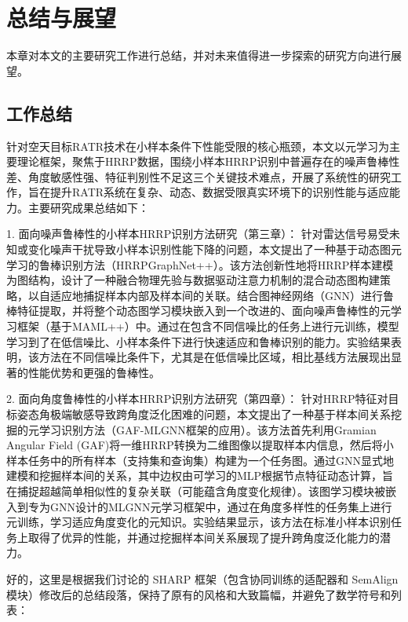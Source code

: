 \chapter{总结与展望}
\label{chap:conclusion}

本章对本文的主要研究工作进行总结，并对未来值得进一步探索的研究方向进行展望。

\section{工作总结}
\label{sec:summary}

针对空天目标RATR技术在小样本条件下性能受限的核心瓶颈，本文以元学习为主要理论框架，聚焦于HRRP数据，围绕小样本HRRP识别中普遍存在的噪声鲁棒性差、角度敏感性强、特征判别性不足这三个关键技术难点，开展了系统性的研究工作，旨在提升RATR系统在复杂、动态、数据受限真实环境下的识别性能与适应能力。主要研究成果总结如下：

1.  面向噪声鲁棒性的小样本HRRP识别方法研究（第三章）： 针对雷达信号易受未知或变化噪声干扰导致小样本识别性能下降的问题，本文提出了一种基于动态图元学习的鲁棒识别方法（HRRPGraphNet++）。该方法创新性地将HRRP样本建模为图结构，设计了一种融合物理先验与数据驱动注意力机制的混合动态图构建策略，以自适应地捕捉样本内部及样本间的关联。结合图神经网络（GNN）进行鲁棒特征提取，并将整个动态图学习模块嵌入到一个改进的、面向噪声鲁棒性的元学习框架（基于MAML++）中。通过在包含不同信噪比的任务上进行元训练，模型学习到了在低信噪比、小样本条件下进行快速适应和鲁棒识别的能力。实验结果表明，该方法在不同信噪比条件下，尤其是在低信噪比区域，相比基线方法展现出显著的性能优势和更强的鲁棒性。

2.  面向角度鲁棒性的小样本HRRP识别方法研究（第四章）： 针对HRRP特征对目标姿态角极端敏感导致跨角度泛化困难的问题，本文提出了一种基于样本间关系挖掘的元学习识别方法（GAF-MLGNN框架的应用）。该方法首先利用Gramian Angular Field (GAF)将一维HRRP转换为二维图像以提取样本内信息，然后将小样本任务中的所有样本（支持集和查询集）构建为一个任务图。通过GNN显式地建模和挖掘样本间的关系，其中边权由可学习的MLP根据节点特征动态计算，旨在捕捉超越简单相似性的复杂关联（可能蕴含角度变化规律）。该图学习模块被嵌入到专为GNN设计的MLGNN元学习框架中，通过在角度多样性的任务集上进行元训练，学习适应角度变化的元知识。实验结果显示，该方法在标准小样本识别任务上取得了优异的性能，并通过挖掘样本间关系展现了提升跨角度泛化能力的潜力。

好的，这里是根据我们讨论的 SHARP 框架（包含协同训练的适配器和 SemAlign 模块）修改后的总结段落，保持了原有的风格和大致篇幅，并避免了数学符号和列表：

